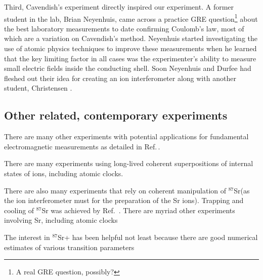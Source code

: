 Third, Cavendish's experiment directly inspired our experiment.
A former student in the lab, Brian Neyenhuis, came across a practice GRE question\footnote{A real GRE question, possibly?} about the best laboratory measurements to date confirming Coulomb's law, most of which are a variation on Cavendish's method. Neyenhuis started investigating the use of atomic physics techniques to improve these measurements when he learned that the key limiting factor in all cases was the experimenter's ability to measure small electric fields inside the conducting shell. Soon Neyenhuis and Durfee had fleshed out their idea for creating an ion interferometer along with another student, Christensen \cite{NeyenhuisIon}\cite{christensen_arxiv_calcs}.  

\subsection{Other related, contemporary experiments}

There are many other experiments with potential applications for fundamental electromagnetic measurements as detailed in Ref.\,\cite{PhotonMassSurvey}. 

There are many experiments using long-lived coherent superpositions of internal states of ions, including atomic clocks\cite{Rosenband_ion_clock}.

There are also many experiments that rely on coherent manipulation of $^{87}$Sr(as the ion interferometer must for the preparation of the Sr ions). Trapping and cooling of $^{87}$Sr was achieved by Ref.~\cite{kurosu_trap_sr}. 
There are myriad other experiments involving Sr, including atomic clocks \cite{ludlow_science}

The interest in $^{87}$Sr+ has been helpful not least because there are good numerical estimates of various transition parameters \cite{safronovaTheory}


